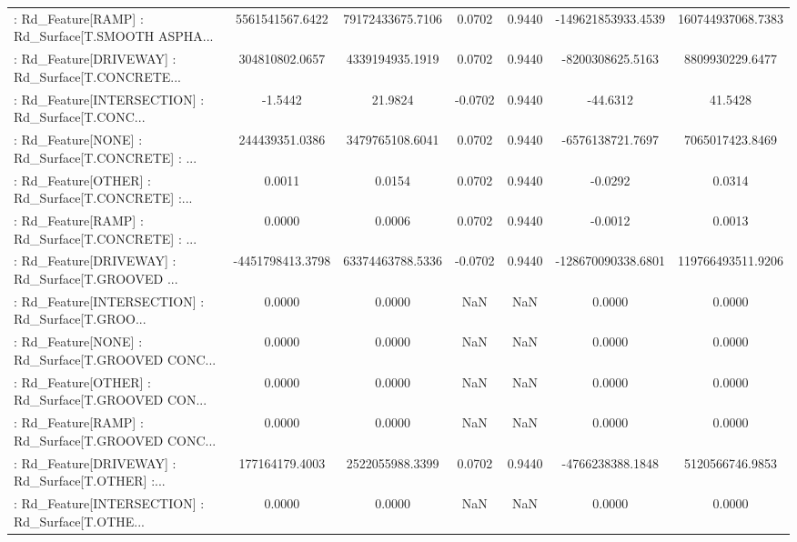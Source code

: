 \begin{longtable}{p{4cm}cccccc}
 : Rd\_Feature[RAMP] : Rd\_Surface[T.SMOOTH ASPHA... &   5561541567.6422 &  79172433675.7106 &  0.0702 &       0.9440 & -149621853933.4539 & 160744937068.7383 \\
 : Rd\_Feature[DRIVEWAY] : Rd\_Surface[T.CONCRETE... &    304810802.0657 &   4339194935.1919 &  0.0702 &       0.9440 &   -8200308625.5163 &   8809930229.6477 \\
 : Rd\_Feature[INTERSECTION] : Rd\_Surface[T.CONC... &           -1.5442 &           21.9824 & -0.0702 &       0.9440 &           -44.6312 &           41.5428 \\
 : Rd\_Feature[NONE] : Rd\_Surface[T.CONCRETE] : ... &    244439351.0386 &   3479765108.6041 &  0.0702 &       0.9440 &   -6576138721.7697 &   7065017423.8469 \\
 : Rd\_Feature[OTHER] : Rd\_Surface[T.CONCRETE] :... &            0.0011 &            0.0154 &  0.0702 &       0.9440 &            -0.0292 &            0.0314 \\
 : Rd\_Feature[RAMP] : Rd\_Surface[T.CONCRETE] : ... &            0.0000 &            0.0006 &  0.0702 &       0.9440 &            -0.0012 &            0.0013 \\
 : Rd\_Feature[DRIVEWAY] : Rd\_Surface[T.GROOVED ... &  -4451798413.3798 &  63374463788.5336 & -0.0702 &       0.9440 & -128670090338.6801 & 119766493511.9206 \\
 : Rd\_Feature[INTERSECTION] : Rd\_Surface[T.GROO... &            0.0000 &            0.0000 &     NaN &          NaN &             0.0000 &            0.0000 \\
 : Rd\_Feature[NONE] : Rd\_Surface[T.GROOVED CONC... &            0.0000 &            0.0000 &     NaN &          NaN &             0.0000 &            0.0000 \\
 : Rd\_Feature[OTHER] : Rd\_Surface[T.GROOVED CON... &            0.0000 &            0.0000 &     NaN &          NaN &             0.0000 &            0.0000 \\
 : Rd\_Feature[RAMP] : Rd\_Surface[T.GROOVED CONC... &            0.0000 &            0.0000 &     NaN &          NaN &             0.0000 &            0.0000 \\
 : Rd\_Feature[DRIVEWAY] : Rd\_Surface[T.OTHER] :... &    177164179.4003 &   2522055988.3399 &  0.0702 &       0.9440 &   -4766238388.1848 &   5120566746.9853 \\
 : Rd\_Feature[INTERSECTION] : Rd\_Surface[T.OTHE... &            0.0000 &            0.0000 &     NaN &          NaN &             0.0000 &            0.0000 \\

\end{longtable}

